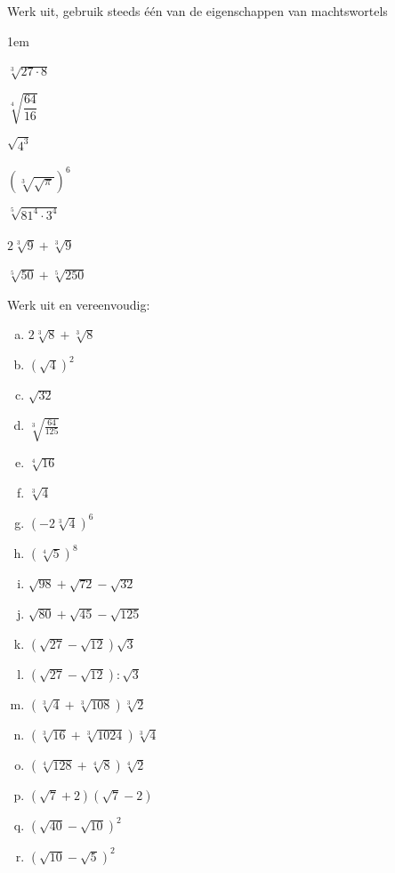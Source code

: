 \documentclass[12pt,twoside,a4paper]{article}
\begin{document}
\begin{oefening}
  Werk uit, gebruik steeds één van de eigenschappen van machtswortels
  \begin{exlist}{3}
    \itemsep1em
  \item $\sqrt[3]{27\cdot 8}$
  \item $\sqrt[4]{\dfrac{64}{16}}$
  \item $\sqrt{4^3}$
  \item $\left(\sqrt[3]{\sqrt{\pi}}\right)^6$
  \item $\sqrt[5]{81^4\cdot 3^4}$
  \item $2\sqrt[3]{9}+ \sqrt[3]{9}$
  \item $\sqrt[5]{50} + \sqrt[5]{250}$
  \end{exlist}
\end{oefening}

\begin{oefening}
Werk uit en vereenvoudig:
\begin{multicols}{3}
\begin{enumerate}[(a)]
  \itemsep1em
  \item $2\sqrt[3]{8}+\sqrt[3]{8}$
  \item $\left(\sqrt{4}\right)^2$
  \item $\sqrt{32}$
  \item $\sqrt[3]{\frac{64}{125}}$
  \item $\sqrt[4]{16}$
  \item $\sqrt[3]{4}$
  \item $\left(-2\sqrt[3]{4}\right)^6$
  \item $\left(\sqrt[4]{5}\right)^8$
  \item $\sqrt{98}+\sqrt{72}-\sqrt{32}$
  \item $\sqrt{80}+\sqrt{45}-\sqrt{125}$
  \item $\left(\sqrt{27}-\sqrt{12}\right)\sqrt{3}$
  \item $\left(\sqrt{27}-\sqrt{12}\right):\sqrt{3}$
  \item $\left(\sqrt[3]{4}+\sqrt[3]{108}\right)\sqrt[3]{2}$
  \item $\left(\sqrt[3]{16}+\sqrt[3]{1024}\right)\sqrt[3]{4}$
  \item $\left(\sqrt[4]{128}+\sqrt[4]{8}\right)\sqrt[4]{2}$
  \item $\left(\sqrt{7}+2\right)\left(\sqrt{7}-2\right)$
  \item $\left(\sqrt{40}-\sqrt{10}\right)^2$
  \item $\left(\sqrt{10}-\sqrt{5}\right)^2$
\end{enumerate}
\end{multicols}
\end{oefening}
\end{document}
